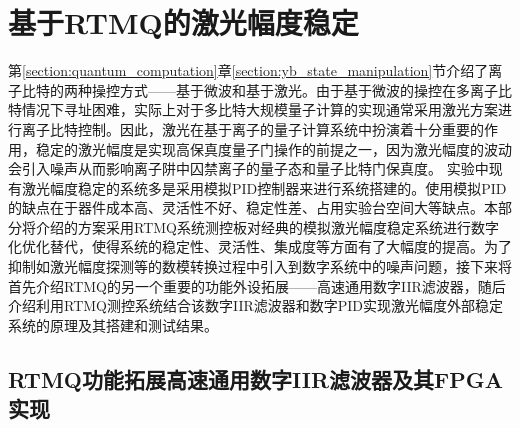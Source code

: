 \section[基于RTMQ的激光幅度稳定]{基于RTMQ的激光幅度稳定\label{section:laser_power_locking}}
第\ref{section:quantum_computation}章\ref{section:yb_state_manipulation}节介绍了离子比特的两种操控方式——基于微波和基于激光。由于基于微波的操控在多离子比特情况下寻址困难，实际上对于多比特大规模量子计算的实现通常采用激光方案进行离子比特控制。因此，激光在基于离子的量子计算系统中扮演着十分重要的作用，稳定的激光幅度是实现高保真度量子门操作的前提之一，因为激光幅度的波动会引入噪声从而影响离子阱中囚禁离子的量子态和量子比特门保真度\cite[]{Blums_Scarabel_Shimizu_Ghadimi_Connell_Händel_Norton_Bridge_Kielpinski_Lobino_et_al_2020}。
实验中现有激光幅度稳定的系统多是采用模拟PID控制器来进行系统搭建的。使用模拟PID的缺点在于器件成本高、灵活性不好、稳定性差、占用实验台空间大等缺点。本部分将介绍的方案采用RTMQ系统测控板对经典的模拟激光幅度稳定系统进行数字化优化替代，使得系统的稳定性、灵活性、集成度等方面有了大幅度的提高。为了抑制如激光幅度探测等的数模转换过程中引入到数字系统中的噪声问题，接下来将首先介绍RTMQ的另一个重要的功能外设拓展——高速通用数字IIR滤波器，随后介绍利用RTMQ测控系统结合该数字IIR滤波器和数字PID实现激光幅度外部稳定系统的原理及其搭建和测试结果。

\subsection[RTMQ功能拓展高速通用数字IIR滤波器及其FPGA实现]{RTMQ功能拓展高速通用数字IIR滤波器及其FPGA实现\label{section:digital_iir}}


